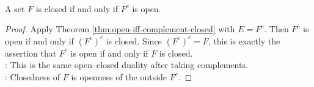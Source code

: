 \begin{corollary} \label{cor:closed-iff-complement-open} \\
A set $F$ is closed if and only if $F^c$ is open.
\begin{proof}
Apply Theorem \ref{thm:open-iff-complement-closed} with $E=F^c$. Then $F^c$ is open if and only if $(F^c)^c$ is closed. Since $(F^c)^c=F$, this is exactly the assertion that $F^c$ is open if and only if $F$ is closed.\\
: This is the same open--closed duality after taking complements.\\
: Closedness of $F$ is openness of the outside $F^c$.
\end{proof}
\end{corollary}

